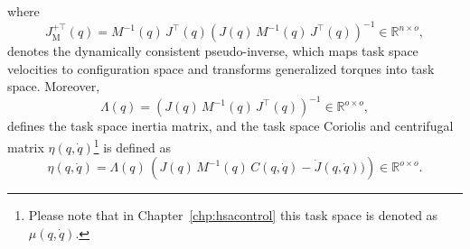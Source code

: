 where 
\begin{equation}
    J_\mathrm{M}^{+\top}(q) = M^{-1}(q) \, J^\top(q) \left ( J(q) \, M^{-1}(q) \, J^\top(q) \right )^{-1} \in \mathbb{R}^{n \times o},
\end{equation}
denotes the dynamically consistent pseudo-inverse\citep{chang1995manipulator}, which maps task space velocities to configuration space and transforms generalized torques into task space. Moreover,
\begin{equation}
    \Lambda(q) = \left ( J(q) \, M^{-1}(q) \, J^\top(q) \right )^{-1} \in \mathbb{R}^{o \times o},
\end{equation}
defines the task space inertia matrix, and the task space Coriolis and centrifugal matrix $\eta(q, \dot{q})$\footnote{Please note that in Chapter~\ref{chp:hsacontrol} this task space is denoted as $\mu(q,\dot{q})$.} is defined as~\citep{khatib1987unified, della2020model}
\begin{equation}
    \eta(q, \dot{q}) = \Lambda(q) \, \left ( J(q) \, M^{-1}(q) \, C(q,\dot{q}) - \dot{J}(q,\dot{q})) \right ) \in \mathbb{R}^{o \times o}.
\end{equation}


